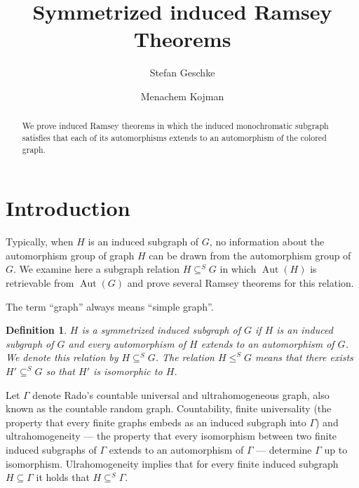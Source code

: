 \documentclass[11pt]{amsart}
\title{Symmetrized induced Ramsey Theorems}
\author{Stefan Geschke}
\author{Menachem Kojman}
\newcommand{\su}{\subseteq}
\newcommand{\aut}{\operatorname{Aut}}
\newtheorem{definition}[theorem]{Definition}
\begin{document}
\maketitle

\begin{abstract}
We prove induced Ramsey theorems in which the induced monochromatic
subgraph  satisfies that  each of its automorphisms extends to an
automorphism of the  colored graph. 
\end{abstract}

\section{Introduction}

Typically, when $H$ is an induced subgraph of $G$, no information about
the automorphism group of graph $H$  can be drawn from the
automorphism group of $G$. We examine here a subgraph relation $H\su^S
G$ in which  $\aut(H)$ is retrievable from  $\aut(G)$ and prove
several Ramsey theorems for this relation.

The term  ``graph'' always  means ``simple graph''. 


\begin{definition}
$H$ is a \emph{symmetrized induced subgraph} of $G$ if $H$ is an
  induced subgraph of $G$ and every automorphism of $H$ extends to an
  automorphism of $G$. We denote this relation by $H\su^S G$. The
  relation $H\le ^S G$ means that there exists $H'\su^S G$ so that
  $H'$ is isomorphic to  $H$.
\end{definition}

Let $\Gamma$ denote Rado's countable universal and ultrahomogeneous
graph, also known as the countable random graph. Countability,
finite universality (the property that every  finite
graphs embeds as an induced subgraph into $\Gamma$) and
ultrahomogeneity --- the property that every isomorphism between two
finite induced subgraphs of $\Gamma$ extends to an automorphism of
$\Gamma$ --- determine $\Gamma$ up to isomorphism. Ulrahomogeneity
implies that for every finite induced subgraph $H\su \Gamma$ it holds
that $H\su^S\Gamma$. 
\end{document}
